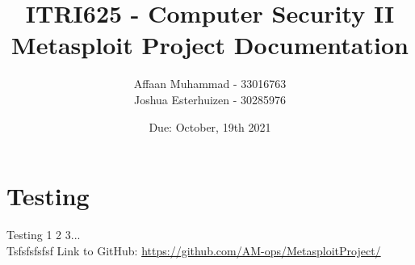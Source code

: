 \documentclass[a4paper, 12pt, titlepage]{report}
\begin{document}
\linespread{1.5}
\author{Affaan Muhammad - 33016763\\Joshua Esterhuizen - 30285976}
\title{ITRI625 - Computer Security II\\Metasploit Project Documentation}
\date{Due: October, 19th 2021}
\maketitle
\tableofcontents{}
\chapter{Testing}
Testing 1 2 3... \cite{wm}\\
Tsfsfsfsfsf
Link to GitHub: \url{https://github.com/AM-ops/MetasploitProject/}
\printbibliography[heading=bibintoc]
\end{document}
